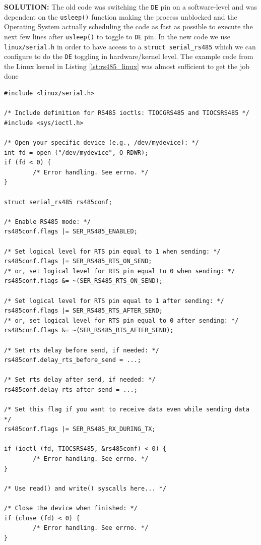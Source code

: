 \newpage
\textbf{SOLUTION:} The old code was switching the \texttt{DE} pin on a software-level and was dependent on the \texttt{usleep()} function making the process unblocked and the Operating System actually scheduling the code as fast as possible to execute the next few lines after \texttt{usleep()} to toggle to \texttt{DE} pin.
In the new code we use \texttt{linux/serial.h} in order to have access to a \texttt{struct serial\_rs485} which we can configure to do the \texttt{DE} toggling in hardware/kernel level.
The example code from the Linux kernel in Listing \ref{lst:rs485_linux} was almost sufficient to get the job done


\begin{lstlisting}[frame=single, caption={Linux RS485 struct to define the \texttt{DE} toggling characteristics in hardware or in the kernel}, captionpos=b, label={lst:rs485_linux}, basicstyle=\small, style=CStyle]
#include <linux/serial.h>

/* Include definition for RS485 ioctls: TIOCGRS485 and TIOCSRS485 */
#include <sys/ioctl.h>

/* Open your specific device (e.g., /dev/mydevice): */
int fd = open ("/dev/mydevice", O_RDWR);
if (fd < 0) {
        /* Error handling. See errno. */
}

struct serial_rs485 rs485conf;

/* Enable RS485 mode: */
rs485conf.flags |= SER_RS485_ENABLED;

/* Set logical level for RTS pin equal to 1 when sending: */
rs485conf.flags |= SER_RS485_RTS_ON_SEND;
/* or, set logical level for RTS pin equal to 0 when sending: */
rs485conf.flags &= ~(SER_RS485_RTS_ON_SEND);

/* Set logical level for RTS pin equal to 1 after sending: */
rs485conf.flags |= SER_RS485_RTS_AFTER_SEND;
/* or, set logical level for RTS pin equal to 0 after sending: */
rs485conf.flags &= ~(SER_RS485_RTS_AFTER_SEND);

/* Set rts delay before send, if needed: */
rs485conf.delay_rts_before_send = ...;

/* Set rts delay after send, if needed: */
rs485conf.delay_rts_after_send = ...;

/* Set this flag if you want to receive data even while sending data */
rs485conf.flags |= SER_RS485_RX_DURING_TX;

if (ioctl (fd, TIOCSRS485, &rs485conf) < 0) {
        /* Error handling. See errno. */
}

/* Use read() and write() syscalls here... */

/* Close the device when finished: */
if (close (fd) < 0) {
        /* Error handling. See errno. */
}
\end{lstlisting}


